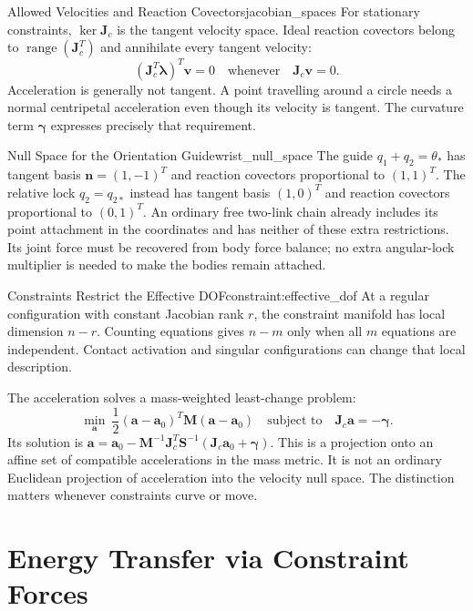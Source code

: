 \begin{definition}{Allowed Velocities and Reaction Covectors}{jacobian_spaces}
For stationary constraints, $\ker\bm J_c$ is the tangent velocity space. Ideal reaction covectors belong to $\operatorname{range}(\bm J_c^T)$ and annihilate every tangent velocity:
\[
(\bm J_c^T\bm\lambda)^T\bm v=0
\quad\text{whenever}\quad\bm J_c\bm v=0.
\]
Acceleration is generally not tangent. A point travelling around a circle needs a normal centripetal acceleration even though its velocity is tangent. The curvature term $\bm\gamma$ expresses precisely that requirement.
\end{definition}

\begin{example}{Null Space for the Orientation Guide}{wrist_null_space}
The guide $q_1+q_2=\theta_*$ has tangent basis $\bm n=(1,-1)^T$ and reaction covectors proportional to $(1,1)^T$. The relative lock $q_2=q_{2*}$ instead has tangent basis $(1,0)^T$ and reaction covectors proportional to $(0,1)^T$. An ordinary free two-link chain already includes its point attachment in the coordinates and has neither of these extra restrictions. Its joint force must be recovered from body force balance; no extra angular-lock multiplier is needed to make the bodies remain attached.
\end{example}

\begin{constraintbox}{Constraints Restrict the Effective DOF}{constraint:effective_dof}
At a regular configuration with constant Jacobian rank $r$, the constraint manifold has local dimension $n-r$. Counting equations gives $n-m$ only when all $m$ equations are independent. Contact activation and singular configurations can change that local description.

The acceleration solves a mass-weighted least-change problem:
\[
\min_{\bm a}\ \frac12(\bm a-\bm a_0)^T\bm M(\bm a-\bm a_0)
\quad\text{subject to}\quad \bm J_c\bm a=-\bm\gamma.
\]
Its solution is $\bm a=\bm a_0-\bm M^{-1}\bm J_c^T\bm S^{-1}(\bm J_c\bm a_0+\bm\gamma)$. This is a projection onto an affine set of compatible accelerations in the mass metric. It is not an ordinary Euclidean projection of acceleration into the velocity null space. The distinction matters whenever constraints curve or move.
\end{constraintbox}

\section{Energy Transfer via Constraint Forces}
\label{sec:energy_transfer_constraints}

